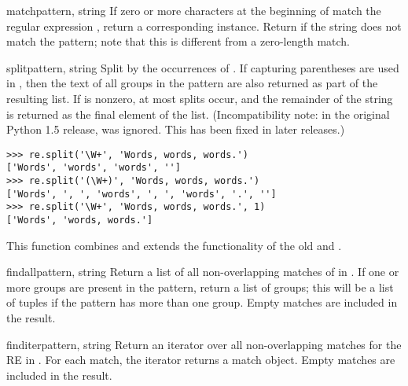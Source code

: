 \begin{funcdesc}{match}{pattern, string}
  If zero or more characters at the beginning of  match
  the regular expression , return a corresponding
   instance.  Return  if the string does not
  match the pattern; note that this is different from a zero-length
  match.

\end{funcdesc}

\begin{funcdesc}{split}{pattern, string}
  Split  by the occurrences of .  If
  capturing parentheses are used in , then the text of all
  groups in the pattern are also returned as part of the resulting list.
  If  is nonzero, at most  splits
  occur, and the remainder of the string is returned as the final
  element of the list.  (Incompatibility note: in the original Python
  1.5 release,  was ignored.  This has been fixed in
  later releases.)

\begin{verbatim}
>>> re.split('\W+', 'Words, words, words.')
['Words', 'words', 'words', '']
>>> re.split('(\W+)', 'Words, words, words.')
['Words', ', ', 'words', ', ', 'words', '.', '']
>>> re.split('\W+', 'Words, words, words.', 1)
['Words', 'words, words.']
\end{verbatim}

  This function combines and extends the functionality of
  the old  and .
\end{funcdesc}

\begin{funcdesc}{findall}{pattern, string}
  Return a list of all non-overlapping matches of  in
  .  If one or more groups are present in the pattern,
  return a list of groups; this will be a list of tuples if the
  pattern has more than one group.  Empty matches are included in the
  result.
\end{funcdesc}

\begin{funcdesc}{finditer}{pattern, string}
  Return an iterator over all non-overlapping matches for the RE
   in .  For each match, the iterator returns
  a match object.  Empty matches are included in the result.
\end{funcdesc}

